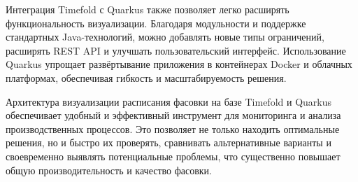 Интеграция Timefold с Quarkus также позволяет легко расширять функциональность визуализации. Благодаря модульности и поддержке стандартных Java-технологий, можно добавлять новые типы ограничений, расширять REST API и улучшать пользовательский интерфейс. Использование Quarkus упрощает развёртывание приложения в контейнерах Docker и облачных платформах, обеспечивая гибкость и масштабируемость решения.

Архитектура визуализации расписания фасовки на базе Timefold и Quarkus обеспечивает удобный и эффективный инструмент для мониторинга и анализа производственных процессов. Это позволяет не только находить оптимальные решения, но и быстро их проверять, сравнивать альтернативные варианты и своевременно выявлять потенциальные проблемы, что существенно повышает общую производительность и качество фасовки.


